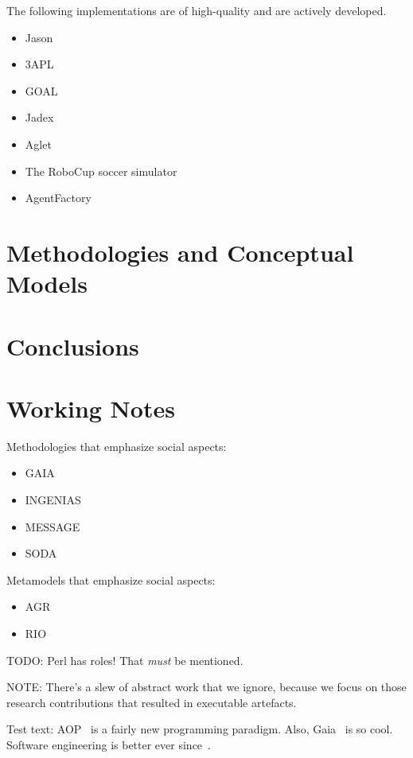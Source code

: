 \documentclass{article}
\begin{document}
The following implementations are of high-quality and are actively developed.
\begin{itemize}
\item Jason~\cite{books/sp/map2005/BordiniHV05}
\item 3APL~\cite{books/sp/map2005/DastaniRM05}
\item GOAL~\cite{hindriks2009programmingrationalagents}
\item Jadex~\cite{todo}
\item Aglet~\cite{todo}
\item The RoboCup soccer simulator
\item AgentFactory
\end{itemize}

\section{Methodologies and Conceptual Models}\label{sec:general_nonsense} %

\section{Conclusions}\label{sec:conclusions} %

\section{Working Notes} %
Methodologies that emphasize social aspects:
\begin{itemize}
\item GAIA~\cite{journals/aamas/WooldridgeJK00}
\item INGENIAS
\item MESSAGE
\item SODA
\end{itemize}
Metamodels that emphasize social aspects:
\begin{itemize}
\item AGR~\cite{conf/aose/FerberGM03}
\item RIO
\end{itemize}

TODO: Perl has roles! That \emph{must} be mentioned.

NOTE: There's a slew of abstract work that we ignore, because we focus on those research contributions that resulted in executable artefacts.

Test text:
AOP~\cite{journals/ai/Shoham93} is a fairly new programming paradigm.
Also, Gaia~\cite{journals/aamas/WooldridgeJK00} is so cool.
Software engineering is better ever since~\cite{conf/aose/WooldridgeC00}.



\end{document}
